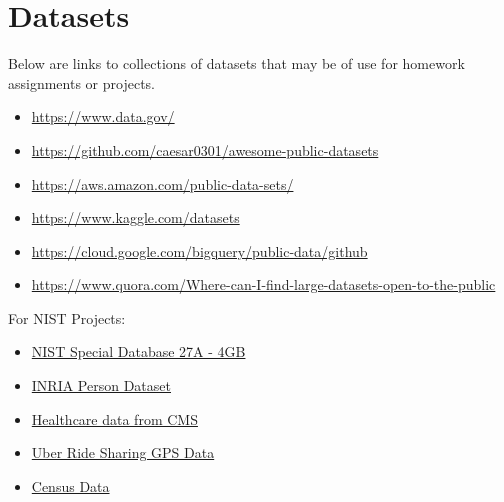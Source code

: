 \section{Datasets}\label{datasets}

Below are links to collections of datasets that may be of use for
homework assignments or projects.

\begin{itemize}
\tightlist
\item
  \url{https://www.data.gov/}
\item
  \url{https://github.com/caesar0301/awesome-public-datasets}
\item
  \url{https://aws.amazon.com/public-data-sets/}
\item
  \url{https://www.kaggle.com/datasets}
\item
  \url{https://cloud.google.com/bigquery/public-data/github}
\item
  \url{https://www.quora.com/Where-can-I-find-large-datasets-open-to-the-public}
\end{itemize}

For NIST Projects:

\begin{itemize}
\tightlist
\item
  \href{http://www.nist.gov/itl/iad/ig/sd27a.cfm}{NIST Special Database
  27A - 4GB}
\item
  \href{http://pascal.inrialpes.fr/data/human/}{INRIA Person Dataset}
\item
  \href{https://www.cms.gov/Research-Statistics-Data-and-Systems/Downloadable-Public-Use-Files/Part-B-National-Summary-Data-File/Overview.html}{Healthcare
  data from CMS}
\item
  \href{https://github.com/fivethirtyeight/uber-tlc-foil-response}{Uber
  Ride Sharing GPS Data}
\item
  \href{http://www.census.gov/population/www/cen2010/glance/}{Census
  Data}
\end{itemize}
